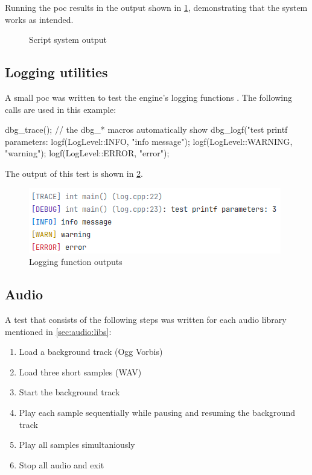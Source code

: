 \documentclass{projdoc}
\begin{document}
Running the \gls{poc} results in the output shown in \cref{fig:poc-output-scripts},
demonstrating that the system works as intended.

\begin{figure}
	\centering
	\caption{Script system  output}
	\label{fig:poc-output-scripts}
\end{figure}

\subsection{Logging utilities}
\label{poc:log}

A small \gls{poc} was written to test the engine's logging functions \autocite[log
example]{crepe:code-repo}. The following calls are used in this example:

\begin{blockcode}
dbg_trace();                                 // the dbg_* macros automatically show
dbg_logf("test printf parameters: %
logf(LogLevel::INFO,    "info message");
logf(LogLevel::WARNING, "warning");
logf(LogLevel::ERROR,   "error");
\end{blockcode}

The output of this test is shown in \cref{fig:poc-log}.

\begin{figure}
	\centering
	\includegraphics[scale=0.7]{img/poc-log.png}
	\caption{Logging function outputs}
	\label{fig:poc-log}
\end{figure}

\subsection{Audio}
\label{poc:audio}

A test that consists of the following steps was written for each audio library
mentioned in \cref{sec:audio:libs}:\noparbreak
\begin{enumerate}
	\item Load a background track (Ogg Vorbis)
	\item Load three short samples (WAV)
	\item Start the background track
	\item Play each sample sequentially while pausing and resuming the background track
	\item Play all samples simultaniously
	\item Stop all audio and exit
\end{enumerate}
\end{document}
